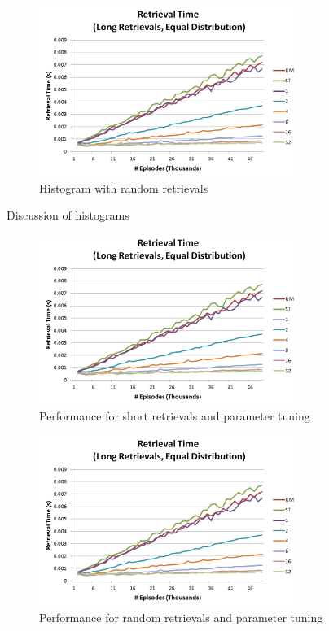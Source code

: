 \documentclass[11pt]{article} %
\begin{document}
\begin{figure}[h]
\caption{Histogram with random retrievals}
\centering
\includegraphics[width=0.75\textwidth]{images/ret_worst_eq}
\end{figure}

Discussion of histograms

\begin{figure}[h]
\caption{Performance for short retrievals and parameter tuning}
\centering
\includegraphics[width=0.75\textwidth]{images/ret_worst_eq}
\end{figure}

\begin{figure}[h]
\caption{Performance for random retrievals and parameter tuning}
\centering
\includegraphics[width=0.75\textwidth]{images/ret_worst_eq}
\end{figure}
\end{document}
